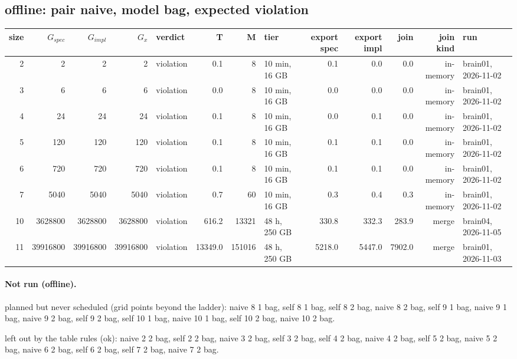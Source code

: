 \documentclass[10pt]{article}
\begin{document}
\subsection*{offline: pair \textsf{naive}, model bag, expected violation}
\begin{longtable}{@{}rrrrlrrlrrrrl@{}}
\toprule
size & $G_{\mathit{spec}}$ & $G_{\mathit{impl}}$ & $G_x$ & verdict & T & M & tier & export spec & export impl & join & join kind & run \\
\midrule
\endhead
\color{red} 2 & 2 & 2 & 2 & violation & 0.1 & 8 & 10 min, 16 GB & 0.1 & 0.0 & 0.0 & in-memory & brain01, 2026-11-02 \\
\color{red} 3 & 6 & 6 & 6 & violation & 0.0 & 8 & 10 min, 16 GB & 0.0 & 0.0 & 0.0 & in-memory & brain01, 2026-11-02 \\
\color{red} 4 & 24 & 24 & 24 & violation & 0.1 & 8 & 10 min, 16 GB & 0.0 & 0.1 & 0.0 & in-memory & brain01, 2026-11-02 \\
\color{red} 5 & 120 & 120 & 120 & violation & 0.1 & 8 & 10 min, 16 GB & 0.1 & 0.1 & 0.0 & in-memory & brain01, 2026-11-02 \\
\color{red} 6 & 720 & 720 & 720 & violation & 0.1 & 8 & 10 min, 16 GB & 0.1 & 0.1 & 0.0 & in-memory & brain01, 2026-11-02 \\
\color{red} 7 & 5040 & 5040 & 5040 & violation & 0.7 & 60 & 10 min, 16 GB & 0.3 & 0.4 & 0.3 & in-memory & brain01, 2026-11-02 \\
\color{blue} 10 & 3628800 & 3628800 & 3628800 & violation & 616.2 & 13321 & 48 h, 250 GB & 330.8 & 332.3 & 283.9 & merge & brain04, 2026-11-05 \\
\color{blue} 11 & 39916800 & 39916800 & 39916800 & violation & 13349.0 & 151016 & 48 h, 250 GB & 5218.0 & 5447.0 & 7902.0 & merge & brain01, 2026-11-03 \\
\bottomrule
\end{longtable}
\paragraph{Not run (offline).}
planned but never scheduled (grid points beyond the ladder): naive 8 1 bag, self 8 1 bag, self 8 2 bag, naive 8 2 bag, self 9 1 bag, naive 9 1 bag, naive 9 2 bag, self 9 2 bag, self 10 1 bag, naive 10 1 bag, self 10 2 bag, naive 10 2 bag.\par
left out by the table rules (ok): naive 2 2 bag, self 2 2 bag, naive 3 2 bag, self 3 2 bag, self 4 2 bag, naive 4 2 bag, self 5 2 bag, naive 5 2 bag, naive 6 2 bag, self 6 2 bag, self 7 2 bag, naive 7 2 bag.\par
\end{document}
